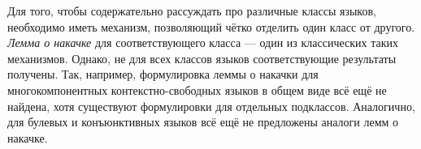Для того, чтобы содержательно рассуждать про различные классы языков, необходимо иметь механизм, позволяющий чётко отделить один класс от другого.
\textit{Лемма о накачке} для соответствующего класса --- один из классических таких механизмов.
Однако, не для всех классов языков соответствующие результаты получены.
Так, например, формулировка леммы о накачки для многокомпонентных контекстно-свободных языков в общем виде всё ещё не найдена, хотя существуют формулировки для отдельных подклассов.
Аналогично, для булевых и конъюнктивных языков всё ещё не предложены аналоги лемм о накачке.


